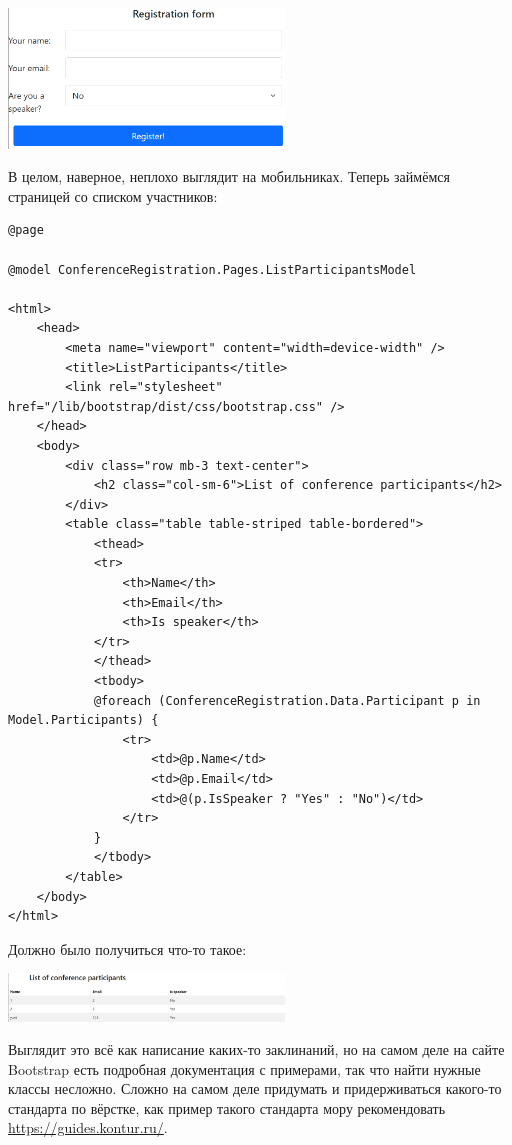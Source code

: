 \documentclass[a5paper]{article}
\begin{document}
\begin{center}
    \includegraphics[width=0.55\textwidth]{styledRegisterForm.png}
\end{center}

В целом, наверное, неплохо выглядит на мобильниках. Теперь займёмся страницей со списком участников:

\begin{verbatim}
@page

@model ConferenceRegistration.Pages.ListParticipantsModel

<html>
    <head>
        <meta name="viewport" content="width=device-width" />
        <title>ListParticipants</title>
        <link rel="stylesheet" href="/lib/bootstrap/dist/css/bootstrap.css" />
    </head>
    <body>
        <div class="row mb-3 text-center">
            <h2 class="col-sm-6">List of conference participants</h2>
        </div>
        <table class="table table-striped table-bordered">
            <thead>
            <tr>
                <th>Name</th>
                <th>Email</th>
                <th>Is speaker</th>
            </tr>
            </thead>
            <tbody>
            @foreach (ConferenceRegistration.Data.Participant p in Model.Participants) {
                <tr>
                    <td>@p.Name</td>
                    <td>@p.Email</td>
                    <td>@(p.IsSpeaker ? "Yes" : "No")</td>
                </tr>
            }
            </tbody>
        </table>
    </body>
</html>
\end{verbatim}

Должно было получиться что-то такое:

\begin{center}
    \includegraphics[width=0.55\textwidth]{styledListParticipants.png}
\end{center}

Выглядит это всё как написание каких-то заклинаний, но на самом деле на сайте Bootstrap есть подробная документация с примерами, так что найти нужные классы несложно. Сложно на самом деле придумать и придерживаться какого-то стандарта по вёрстке, как пример такого стандарта мору рекомендовать \url{https://guides.kontur.ru/}.
\end{document}
